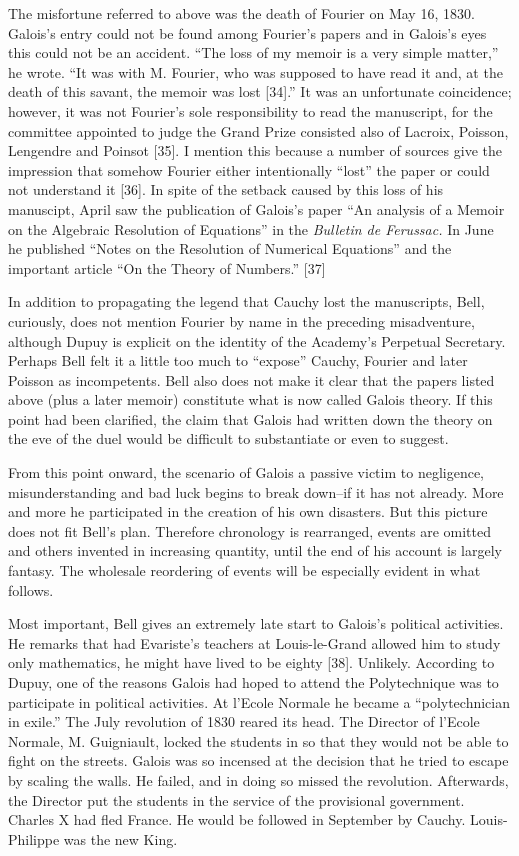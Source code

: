 \documentclass[12pt]{article}
\begin{document}
The misfortune referred to above was the death of Fourier on May 16, 1830. Galois's entry could not be found among Fourier's papers and in Galois's eyes this could not be an accident. ``The loss of my memoir is a very simple matter,'' he wrote. ``It was with M. Fourier, who was supposed to have read it and, at the death of this savant, the memoir was lost [34].'' It was an unfortunate coincidence; however, it was not Fourier's sole responsibility to read the manuscript, for the committee appointed to judge the Grand Prize consisted also of Lacroix, Poisson, Lengendre and Poinsot [35]. I mention this because a number of sources give the impression that somehow Fourier either intentionally ``lost'' the paper or could not understand it [36]. In spite of the setback caused by this loss of his manuscipt, April saw the publication of Galois's paper ``An analysis of a Memoir on the Algebraic Resolution of Equations'' in the \emph{Bulletin de Ferussac.} In June he published ``Notes on the Resolution of Numerical Equations'' and the important article ``On the Theory of Numbers.'' [37]

In addition to propagating the legend that Cauchy lost the manuscripts, Bell, curiously, does not mention Fourier by name in the preceding misadventure, although Dupuy is explicit on the identity of the Academy's Perpetual Secretary. Perhaps Bell felt it a little too much to ``expose'' Cauchy, Fourier and later Poisson as incompetents. Bell also does not make it clear that the papers listed above (plus a later memoir) constitute what is now called Galois theory. If this point had been clarified, the claim that Galois had written down the theory on the eve of the duel would be difficult to substantiate or even to suggest.

From this point onward, the scenario of Galois a passive victim to negligence, misunderstanding and bad luck begins to break down--if it has not already. More and more he participated in the creation of his own disasters. But this picture does not fit Bell's plan. Therefore chronology is rearranged, events are omitted and others invented in increasing quantity, until the end of his account is largely fantasy. The wholesale reordering of events will be especially evident in what follows.

Most important, Bell gives an extremely late start to Galois's political activities. He remarks that had Evariste's teachers at Louis-le-Grand allowed him to study only mathematics, he might have lived to be eighty [38]. Unlikely. According to Dupuy, one of the reasons Galois had hoped to attend the Polytechnique was to participate in political activities. At l'Ecole Normale he became a ``polytechnician in exile.'' The July revolution of 1830 reared its head. The Director of l'Ecole Normale, M. Guigniault, locked the students in so that they would not be able to fight on the streets. Galois was so incensed at the decision that he tried to escape by scaling the walls. He failed, and in doing so missed the revolution. Afterwards, the Director put the students in the service of the provisional government. Charles X had fled France. He would be followed in September by Cauchy. Louis-Philippe was the new King.
\end{document}
